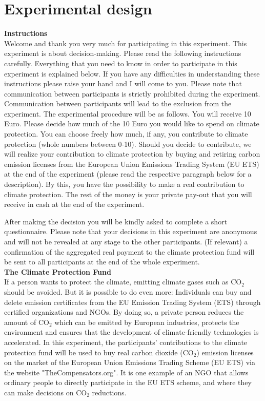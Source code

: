 \documentclass[review, authoryear,12pt]{elsarticle}
\begin{document}
\clearpage


\appendix

\section{Experimental design}
\label{appa}
\textbf{Instructions} \\
Welcome and thank you very much for participating in this experiment.
This experiment is about decision-making. Please read the following instructions carefully. Everything that you need to know in order to participate in this experiment is explained below. If you have any difficulties in understanding these instructions please raise your hand and I will come to you.
Please note that communication between participants is strictly prohibited during the experiment. Communication between participants will lead to the exclusion from the experiment.
The experimental procedure will be as follows.
You will receive 10 Euro. Please decide how much of the 10 Euro you would like to spend on climate protection. You can choose freely how much, if any, you contribute to climate protection (whole numbers between 0-10).
Should you decide to contribute, we will realize your contribution to climate protection by buying and retiring carbon emission licenses from the European Union Emissions Trading System (EU ETS) at the end of the experiment (please read the respective paragraph below for a description). By this, you have the possibility to make a real contribution to climate protection. The rest of the money is your private pay-out that you will receive in cash at the end of the experiment.

After making the decision you will be kindly asked to complete a short questionnaire.
Please note that your decisions in this experiment are anonymous and will not be revealed at any stage to the other participants. (If relevant) a confirmation of the aggregated real payment to the climate protection fund will be sent to all participants at the end of the whole experiment. \\

\textbf{The Climate Protection Fund} \\
If a person wants to protect the climate, emitting climate gases such as CO$_2$ should be avoided. But it is possible to do even more: Individuals can buy and delete emission certificates from the EU Emission Trading System (ETS) through certified organizations and NGOs. By doing so, a private person reduces the amount of CO$_2$ which can be emitted by European industries, protects the environment and ensures that the development of climate-friendly technologies is accelerated.
In this experiment, the participants' contributions to the climate protection fund will be used to buy real carbon dioxide (CO$_2$) emission licenses on the market of the European Union Emissions Trading Scheme (EU ETS) via the website "TheCompensators.org". It is one example of an NGO that allows ordinary people to directly participate in the EU ETS scheme, and where they can make decisions on CO$_2$ reductions.
\end{document}
